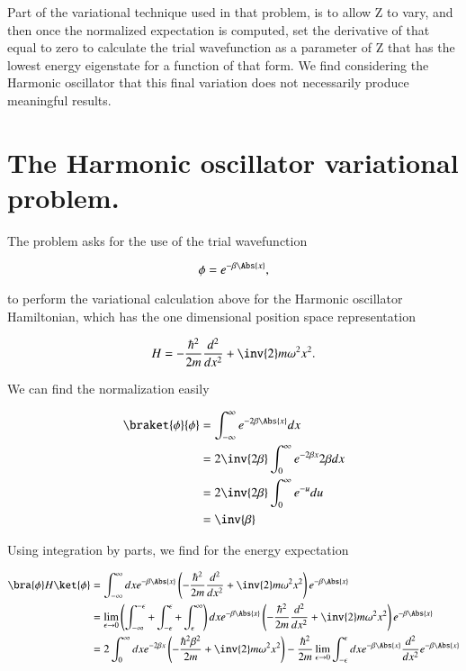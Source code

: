 Part of the variational technique used in that problem, is to allow Z to vary, and then once the normalized expectation is computed, set the derivative of that equal to zero to calculate the trial wavefunction as a parameter of Z that has the lowest energy eigenstate for a function of that form.  We find considering the Harmonic oscillator that this final variation does not necessarily produce meaningful results.

\section{The Harmonic oscillator variational problem.}

The problem asks for the use of the trial wavefunction

\begin{equation}\label{eqn:variationHarmonicOscillator:130}
\phi = e^{-\beta \Abs{x}},
\end{equation}

to perform the variational calculation above for the Harmonic oscillator Hamiltonian, which has the one dimensional position space representation

\begin{equation}\label{eqn:variationHarmonicOscillator:150}
H = -\frac{\hbar^2}{2m} \frac{d^2}{dx^2} + \inv{2} m \omega^2 x^2.
\end{equation}

We can find the normalization easily

\begin{align*}
\braket{\phi}{\phi} 
&= \int_{-\infty}^\infty e^{- 2 \beta \Abs{x}} dx \\
&= 2 \inv{2 \beta} \int_{0}^\infty e^{- 2 \beta x} 2 \beta dx \\
&= 2 \inv{2 \beta} \int_{0}^\infty e^{- u} du \\
&= \inv{\beta}
\end{align*}

Using integration by parts, we find for the energy expectation

\begin{align*}
\bra{\phi} H \ket{\phi} 
&= 
\int_{-\infty}^\infty dx
e^{- \beta \Abs{x}} 
\left( -\frac{\hbar^2}{2m} \frac{d^2}{dx^2} + \inv{2} m \omega^2 x^2 \right)
e^{- \beta \Abs{x}}  \\
&=
\lim_{\epsilon \rightarrow 0}
\left(
\int_{-\infty}^{-\epsilon}
+
\int_{-\epsilon}^\epsilon 
+
\int_{\epsilon}^\infty 
\right)
dx
e^{- \beta \Abs{x}} 
\left( -\frac{\hbar^2}{2m} \frac{d^2}{dx^2} + \inv{2} m \omega^2 x^2 \right)
e^{- \beta \Abs{x}}  \\
&=
2 \int_{0}^\infty dx
e^{ - 2 \beta x } 
\left( -\frac{\hbar^2 \beta^2}{2m} + \inv{2} m \omega^2 x^2 \right)
-
\frac{\hbar^2}{2m} 
\lim_{\epsilon \rightarrow 0}
\int_{-\epsilon}^\epsilon 
dx
e^{- \beta \Abs{x}} 
\frac{d^2}{dx^2} 
e^{- \beta \Abs{x}} 
\end{align*}

